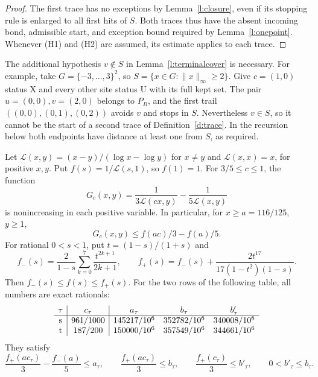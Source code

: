 \begin{proof}
The first trace has no exceptions by Lemma~\ref{l:closure},
even if its stopping rule is enlarged to all first hits of \(S\).
Both traces thus have the absent incoming bond, admissible start,
and exception bound required by Lemma~\ref{l:onepoint}.  Whenever
(H1) and (H2) are assumed, its estimate applies to each trace.
\end{proof}

\begin{remark}
The additional hypothesis \(v\notin S\) in
Lemma~\ref{l:terminalcover} is necessary.  For example, take
\(G=\{-3,\ldots,3\}^2\), so
\(S=\{x\in G:\|x\|_\infty\ge2\}\).  Give \(c=(1,0)\)
status \(\mathrm X\) and every other site status \(\mathrm U\)
with its full kept set.  The pair \(u=(0,0),v=(2,0)\) belongs to
\(P_B\), and the first trail
\(((0,0),(0,1),(0,2))\) avoids \(v\) and stops in \(S\).
Nevertheless \(v\in S\), so it cannot be the start of a second
trace of Definition~\ref{d:trace}.  In the recursion below both
endpoints have distance at least one from \(S\), as required.
\end{remark}

\begin{lemma}\label{l:log-mean-bounds}
Let \(\mathcal L(x,y)=(x-y)/(\log x-\log y)\) for \(x\ne y\)
and \(\mathcal L(x,x)=x\), for positive \(x,y\).
Put \(f(s)=1/\mathcal L(s,1)\), so \(f(1)=1\).
For \(3/5\le c\le1\), the function
\[
 G_c(x,y)=\frac1{3\mathcal L(cx,y)}-\frac1{5\mathcal L(x,y)}
\]
is nonincreasing in each positive variable. In particular,
for \(x\ge a=116/125\), \(y\ge1\),
\[
 G_c(x,y)\le f(ac)/3-f(a)/5.
\]
For rational \(0<s<1\), put \(t=(1-s)/(1+s)\) and
\[
 f_-(s)=\frac2{1-s}\sum_{k=0}^{7}\frac{t^{2k+1}}{2k+1},
 \qquad
 f_+(s)=f_-(s)+\frac{2t^{17}}{17(1-t^2)(1-s)}.
\]
Then \(f_-(s)\le f(s)\le f_+(s)\).
For the two rows of the following table, all numbers are exact rationals:
\[
 \begin{array}{c|c|ccc}
 \tau&c_\tau&a_\tau&b_\tau&b'_\tau\\ \hline
 {\rm s}&961/1000&145217/10^6&352782/10^6&340008/10^6\\
 {\rm t}&187/200&150000/10^6&357549/10^6&344661/10^6
 \end{array}
\]
They satisfy
\[
 \frac{f_+(ac_\tau)}3-\frac{f_-(a)}5\le a_\tau,\qquad
 \frac{f_+(ac_\tau)}3\le b_\tau,\qquad
 \frac{f_+(c_\tau)}3\le b'_\tau,\qquad
 0<b'_\tau\le b_\tau .
\]
\end{lemma}

